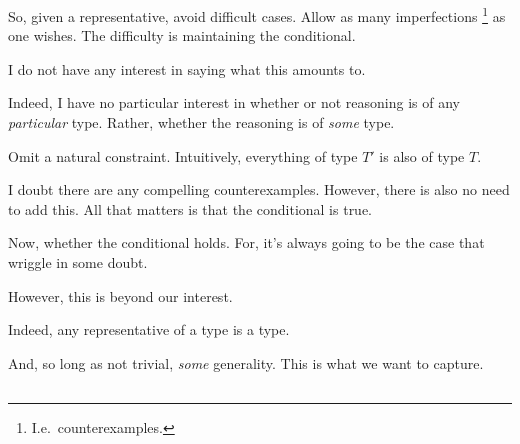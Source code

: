 \begin{note}
  So, given a representative, avoid difficult cases.
  Allow as many imperfections%
  \footnote{
    I.e.\ counterexamples.
  }
  as one wishes.
  The difficulty is maintaining the conditional.

  I do not have any interest in saying what this amounts to.

  Indeed, I have no particular interest in whether or not reasoning is of any \emph{particular} type.
  Rather, whether the reasoning is of \emph{some} type.
\end{note}

\begin{note}
  Omit a natural constraint.
  Intuitively, everything of type \(T'\) is also of type \(T\).

  I doubt there are any compelling counterexamples.
  However, there is also no need to add this.
  All that matters is that the conditional is true.
\end{note}

\begin{note}
  Now, whether the conditional holds.
  For, it's always going to be the case that wriggle in some doubt.

  However, this is beyond our interest.

  Indeed, any representative of a type is a type.

  And, so long as not trivial, \emph{some} generality.
  This is what we want to capture.
\end{note}

\subsection{}
\label{sec:tr3}

